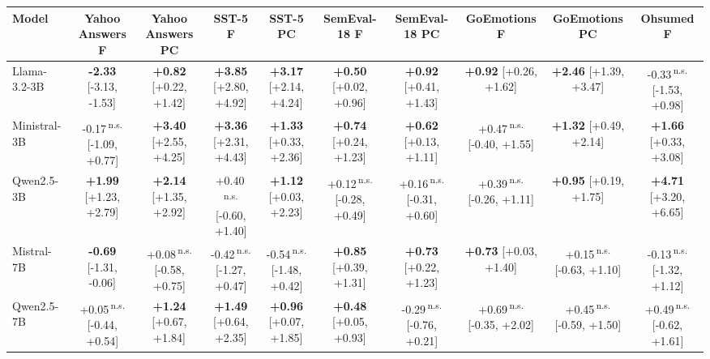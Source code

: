 \begin{tabular}{lccccccccc}
\toprule
Model & Yahoo Answers F & Yahoo Answers PC & SST-5 F & SST-5 PC & SemEval-18 F & SemEval-18 PC & GoEmotions F & GoEmotions PC & Ohsumed F \\
\midrule
Llama-3.2-3B & \textbf{-2.33} {\scriptsize [-3.13, -1.53]} & \textbf{+0.82} {\scriptsize [+0.22, +1.42]} & \textbf{+3.85} {\scriptsize [+2.80, +4.92]} & \textbf{+3.17} {\scriptsize [+2.14, +4.24]} & \textbf{+0.50} {\scriptsize [+0.02, +0.96]} & \textbf{+0.92} {\scriptsize [+0.41, +1.43]} & \textbf{+0.92} {\scriptsize [+0.26, +1.62]} & \textbf{+2.46} {\scriptsize [+1.39, +3.47]} & -0.33\,\textsuperscript{n.s.} {\scriptsize [-1.53, +0.98]} \\
Ministral-3B & -0.17\,\textsuperscript{n.s.} {\scriptsize [-1.09, +0.77]} & \textbf{+3.40} {\scriptsize [+2.55, +4.25]} & \textbf{+3.36} {\scriptsize [+2.31, +4.43]} & \textbf{+1.33} {\scriptsize [+0.33, +2.36]} & \textbf{+0.74} {\scriptsize [+0.24, +1.23]} & \textbf{+0.62} {\scriptsize [+0.13, +1.11]} & +0.47\,\textsuperscript{n.s.} {\scriptsize [-0.40, +1.55]} & \textbf{+1.32} {\scriptsize [+0.49, +2.14]} & \textbf{+1.66} {\scriptsize [+0.33, +3.08]} \\
Qwen2.5-3B & \textbf{+1.99} {\scriptsize [+1.23, +2.79]} & \textbf{+2.14} {\scriptsize [+1.35, +2.92]} & +0.40\,\textsuperscript{n.s.} {\scriptsize [-0.60, +1.40]} & \textbf{+1.12} {\scriptsize [+0.03, +2.23]} & +0.12\,\textsuperscript{n.s.} {\scriptsize [-0.28, +0.49]} & +0.16\,\textsuperscript{n.s.} {\scriptsize [-0.31, +0.60]} & +0.39\,\textsuperscript{n.s.} {\scriptsize [-0.26, +1.11]} & \textbf{+0.95} {\scriptsize [+0.19, +1.75]} & \textbf{+4.71} {\scriptsize [+3.20, +6.65]} \\
Mistral-7B & \textbf{-0.69} {\scriptsize [-1.31, -0.06]} & +0.08\,\textsuperscript{n.s.} {\scriptsize [-0.58, +0.75]} & -0.42\,\textsuperscript{n.s.} {\scriptsize [-1.27, +0.47]} & -0.54\,\textsuperscript{n.s.} {\scriptsize [-1.48, +0.42]} & \textbf{+0.85} {\scriptsize [+0.39, +1.31]} & \textbf{+0.73} {\scriptsize [+0.22, +1.23]} & \textbf{+0.73} {\scriptsize [+0.03, +1.40]} & +0.15\,\textsuperscript{n.s.} {\scriptsize [-0.63, +1.10]} & -0.13\,\textsuperscript{n.s.} {\scriptsize [-1.32, +1.12]} \\
Qwen2.5-7B & +0.05\,\textsuperscript{n.s.} {\scriptsize [-0.44, +0.54]} & \textbf{+1.24} {\scriptsize [+0.67, +1.84]} & \textbf{+1.49} {\scriptsize [+0.64, +2.35]} & \textbf{+0.96} {\scriptsize [+0.07, +1.85]} & \textbf{+0.48} {\scriptsize [+0.05, +0.93]} & -0.29\,\textsuperscript{n.s.} {\scriptsize [-0.76, +0.21]} & +0.69\,\textsuperscript{n.s.} {\scriptsize [-0.35, +2.02]} & +0.45\,\textsuperscript{n.s.} {\scriptsize [-0.59, +1.50]} & +0.49\,\textsuperscript{n.s.} {\scriptsize [-0.62, +1.61]} \\

\end{tabular}
